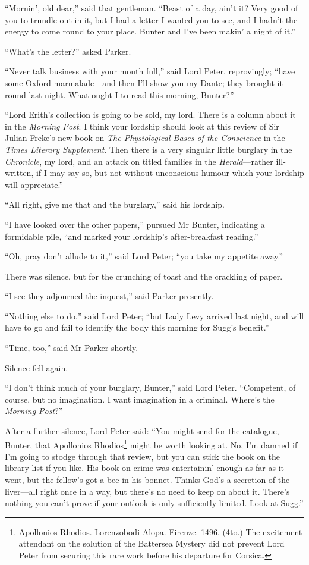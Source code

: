 \enquote{Mornin’, old dear,} said that gentleman. \enquote{Beast of a day, ain’t it? Very good of you to trundle out in it, but I had a letter I wanted you to see, and I hadn’t the energy to come round to your place. Bunter and I’ve been makin’ a night of it.}

\enquote{What’s the letter?} asked Parker.

\enquote{Never talk business with your mouth full,} said Lord Peter, reprovingly; \enquote{have some Oxford marmalade\allowbreak---\allowbreak and then I’ll show you my Dante; they brought it round last night. What ought I to read this morning, Bunter?}

\enquote{Lord Erith’s collection is going to be sold, my lord. There is a column about it in the \textit{Morning Post}. I think your lordship should look at this review of Sir Julian Freke’s new book on \textit{The Physiological Bases of the Conscience} in the \textit{Times Literary Supplement}. Then there is a very singular little burglary in the \textit{Chronicle}, my lord, and an attack on titled families in the \textit{Herald}---rather ill-written, if I may say so, but not without unconscious humour which your lordship will appreciate.}

\enquote{All right, give me that and the burglary,} said his lordship.

\enquote{I have looked over the other papers,} pursued Mr Bunter, indicating a formidable pile, \enquote{and marked your lordship’s after-breakfast reading.}

\enquote{Oh, pray don’t allude to it,} said Lord Peter; \enquote{you take my appetite away.}

There was silence, but for the crunching of toast and the crackling of paper.

\enquote{I see they adjourned the inquest,} said Parker presently.

\enquote{Nothing else to do,} said Lord Peter; \enquote{but Lady Levy arrived last night, and will have to go and fail to identify the body this morning for Sugg’s benefit.}

\enquote{Time, too,} said Mr Parker shortly.

Silence fell again.

\enquote{I don’t think much of your burglary, Bunter,} said Lord Peter. \enquote{Competent, of course, but no imagination. I want imagination in a criminal. Where’s the \textit{Morning Post}?}

After a further silence, Lord Peter said: \enquote{You might send for the catalogue, Bunter, that Apollonios Rhodios\footnote{Apollonios Rhodios. Lorenzobodi Alopa. Firenze. 1496. (4to.) The excitement attendant on the solution of the Battersea Mystery did not prevent Lord Peter from securing this rare work before his departure for Corsica.} might be worth looking at. No, I’m damned if I’m going to stodge through that review, but you can stick the book on the library list if you like. His book on crime was entertainin’ enough as far as it went, but the fellow’s got a bee in his bonnet. Thinks God’s a secretion of the liver\allowbreak---\allowbreak all right once in a way, but there’s no need to keep on about it. There’s nothing you can’t prove if your outlook is only sufficiently limited. Look at Sugg.}

